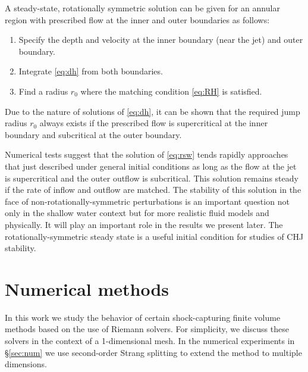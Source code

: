 \documentclass[preprint, 11pt]{article}
\begin{document}
A steady-state, rotationally symmetric solution can be given for an annular region with prescribed
flow at the inner and outer boundaries as follows:

\begin{enumerate}
    \item Specify the depth and velocity at the inner boundary (near the jet) and outer boundary.
    \item Integrate \eqref{eq:dh} from both boundaries.
    \item Find a radius $r_0$ where the matching condition \eqref{eq:RH} is satisfied.
\end{enumerate}
Due to the nature of solutions of \eqref{eq:dh}, it can be shown that the required jump
radius $r_0$ always exists if the prescribed flow is supercritical at the inner boundary
and subcritical at the outer boundary.

Numerical tests suggest that the solution of \eqref{eq:rsw} tends rapidly approaches that
just described under general initial conditions as long as the flow at the jet is
supercritical and the outer outflow is subcritical.  This solution remains steady
if the rate of inflow and outflow are matched.  The stability of this solution in
the face of non-rotationally-symmetric perturbations is an important question not
only in the shallow water context but for more realistic fluid models and physically.
It will play an important role in the results we present later.
The rotationally-symmetric steady state is a useful initial condition for studies
of CHJ stability.


\section{Numerical methods}
In this work we study the behavior of certain shock-capturing finite volume
methods based on the use of Riemann solvers.  For simplicity, we discuss these
solvers in the context of a 1-dimensional mesh.  
In the numerical experiments in \S\ref{sec:num} we use second-order Strang
splitting \cite{strang1968construction} to extend the method to multiple dimensions.
\end{document}
